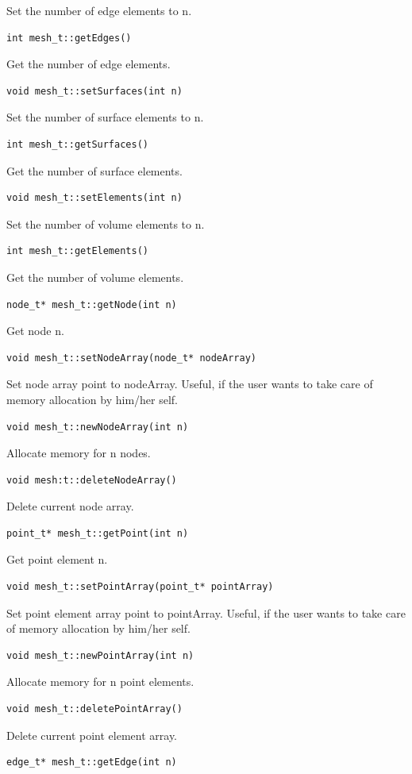 Set the number of edge elements to n.
\begin{verbatim}   
int mesh_t::getEdges()
\end{verbatim}
Get the number of edge elements.
\begin{verbatim} 
void mesh_t::setSurfaces(int n)
\end{verbatim}
Set the number of surface elements to n.
\begin{verbatim} 
int mesh_t::getSurfaces()
\end{verbatim}
Get the number of surface elements.
\begin{verbatim} 
void mesh_t::setElements(int n)
\end{verbatim}
Set the number of volume elements to n.
\begin{verbatim} 
int mesh_t::getElements()
\end{verbatim}
Get the number of volume elements.
\begin{verbatim} 
node_t* mesh_t::getNode(int n)
\end{verbatim}
Get node n.
\begin{verbatim} 
void mesh_t::setNodeArray(node_t* nodeArray)
\end{verbatim}
Set node array point to nodeArray. Useful, if the user wants to take care of memory allocation by him/her self.
\begin{verbatim} 
void mesh_t::newNodeArray(int n)
\end{verbatim}
Allocate memory for n nodes.
\begin{verbatim}
void mesh:t::deleteNodeArray()
\end{verbatim}
Delete current node array.
\begin{verbatim}
point_t* mesh_t::getPoint(int n)
\end{verbatim}
Get point element n.
\begin{verbatim}
void mesh_t::setPointArray(point_t* pointArray)
\end{verbatim}
Set point element array point to pointArray. Useful, if the user wants to take care of memory allocation by him/her self.
\begin{verbatim} 
void mesh_t::newPointArray(int n)
\end{verbatim}
Allocate memory for n point elements.
\begin{verbatim}
void mesh_t::deletePointArray()
\end{verbatim}
Delete current point element array.
\begin{verbatim}
edge_t* mesh_t::getEdge(int n)
\end{verbatim}
